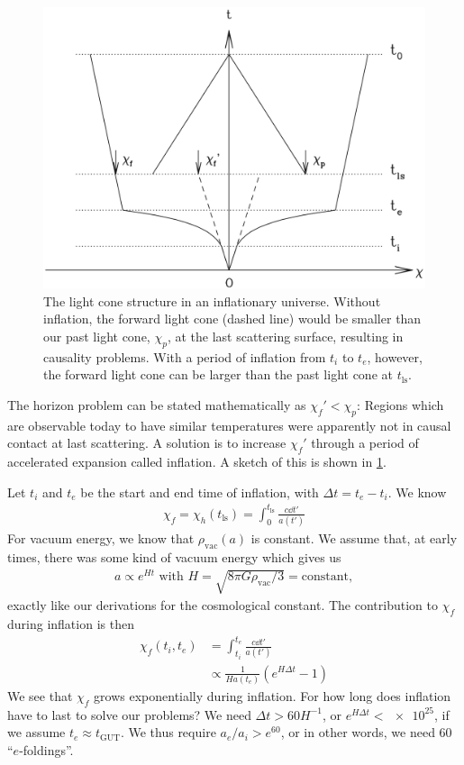 \begin{figure}
	\centering
	\includegraphics[width=\textwidth]{img/ch-02/inflation.png}
	\caption{The light cone structure in an inflationary universe. Without inflation, the forward light cone (dashed line) would be smaller than our past light cone, $\chi_p$, at the last scattering surface, resulting in causality problems. With a period of inflation from $t_i$ to $t_e$, however, the forward light cone can be larger than the past light cone at $t_\text{ls}$.}
	\label{fig:inflation}
\end{figure}


The horizon problem can be stated mathematically as $\chi_f' < \chi_p$: Regions which are observable today to have similar temperatures were apparently not in causal contact at last scattering. A solution is to increase $\chi_f'$ through a period of accelerated expansion called inflation. A sketch of this is shown in \cref{fig:inflation}.

Let $t_i$ and $t_e$ be the start and end time of inflation, with $\Delta t = t_e - t_i$. We know
\begin{align*}
	\chi_f = \chi_h(t_\text{ls})
	= \int_0^{t_\text{ls}} \frac{c \dd{t'}}{a(t')}
\end{align*}
For vacuum energy, we know that $\rho_\text{vac}(a)$ is constant. We assume that, at early times, there was some kind of vacuum energy which gives us
\begin{align*}
	a \propto e^{Ht} \text{ with } 
	H = \sqrt{8 \pi G \rho_\text{vac}/3} = \text{constant},
\end{align*}
exactly like our derivations for the cosmological constant.
The contribution to $\chi_f$ during inflation is then
\begin{align*}
	\chi_f(t_i,t_e)
	&= \int_{t_i}^{t_e} \frac{c \dd{t'}}{a(t')}\\
	&\propto \frac{1}{H a(t_e)} (e^{H \Delta t} - 1)
\end{align*}
We see that $\chi_f$ grows exponentially during inflation. For how long does inflation have to last to solve our problems? We need $\Delta t > 60 H^{-1}$, or $e^{H \Delta t} < \num{e25}$, if we assume $t_e \approx t_\text{GUT}$. We thus require $a_e/a_i > e^{60}$, or in other words, we need $60$ \enquote{$e$-foldings}.


